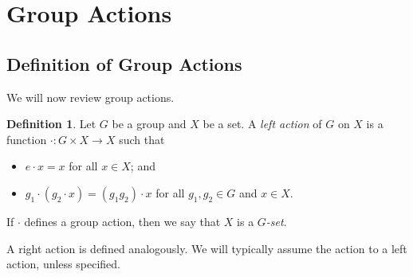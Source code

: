 \documentclass[a4paper, openany]{memoir}
\theoremstyle{definition}
\newtheorem{definition}{Definition}[section]
\theoremstyle{plain}
\begin{document}
\newpage

\section{Group Actions}
\subsection{Definition of Group Actions}
We will now review group actions.
\begin{definition}
Let $G$ be a group and $X$ be a set. A \emph{left action} of $G$ on $X$ is a function $\cdot: G \times X \to X$ such that
\begin{itemize}
    \item $e \cdot x = x$ for all $x \in X$; and
    \item $g_1 \cdot (g_2 \cdot x) = (g_1 g_2) \cdot x$ for all $g_1, g_2 \in G$ and $x \in X$.
\end{itemize}
If $\cdot$ defines a group action, then we say that $X$ is a \emph{$G$-set}.
\end{definition}
\noindent A right action is defined analogously. We will typically assume the action to a left action, unless specified.
\end{document}
